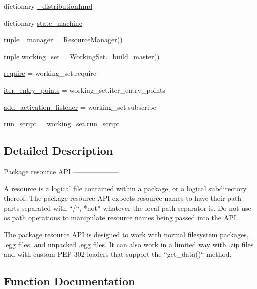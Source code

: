 \begin{DoxyCompactItemize}
$$\item 
dictionary \hyperlink{namespacepkg__resources_aad2eda4b879b00de50473c3c5c8b62c9}{\+\_\+distribution\+Impl}
\item 
dictionary \hyperlink{namespacepkg__resources_afec689ab0e66f096a179ffb991c68dcf}{state\+\_\+machine}
\item 
tuple \hyperlink{namespacepkg__resources_a0fe769980e5a33eee090ffbb7a7663ff}{\+\_\+manager} = \hyperlink{classpkg__resources_1_1ResourceManager}{Resource\+Manager}()
\item 
tuple \hyperlink{namespacepkg__resources_a6137cc4c4f6d3a3857ad3e7d1b57f070}{working\+\_\+set} = Working\+Set.\+\_\+build\+\_\+master()
\item 
\hyperlink{namespacepkg__resources_a4b0ffc0687f16fe370416cea417a456f}{require} = working\+\_\+set.\+require
\item 
\hyperlink{namespacepkg__resources_a0003897e2044a6bedb14a89ad7cc5ce9}{iter\+\_\+entry\+\_\+points} = working\+\_\+set.\+iter\+\_\+entry\+\_\+points
\item 
\hyperlink{namespacepkg__resources_a4a44c235f589f75c875c7f50d393214c}{add\+\_\+activation\+\_\+listener} = working\+\_\+set.\+subscribe
\item 
\hyperlink{namespacepkg__resources_a0932ef76c1744247fcf831d0bcbcaad6}{run\+\_\+script} = working\+\_\+set.\+run\+\_\+script
\end{DoxyCompactItemize}


\subsection{Detailed Description}
\begin{DoxyVerb}Package resource API
--------------------

A resource is a logical file contained within a package, or a logical
subdirectory thereof.  The package resource API expects resource names
to have their path parts separated with ``/``, *not* whatever the local
path separator is.  Do not use os.path operations to manipulate resource
names being passed into the API.

The package resource API is designed to work with normal filesystem packages,
.egg files, and unpacked .egg files.  It can also work in a limited way with
.zip files and with custom PEP 302 loaders that support the ``get_data()``
method.
\end{DoxyVerb}
 

\subsection{Function Documentation}
\hypertarget{namespacepkg__resources_ad5b6b4e0dd166154f7c4251494ab4d27}{}

